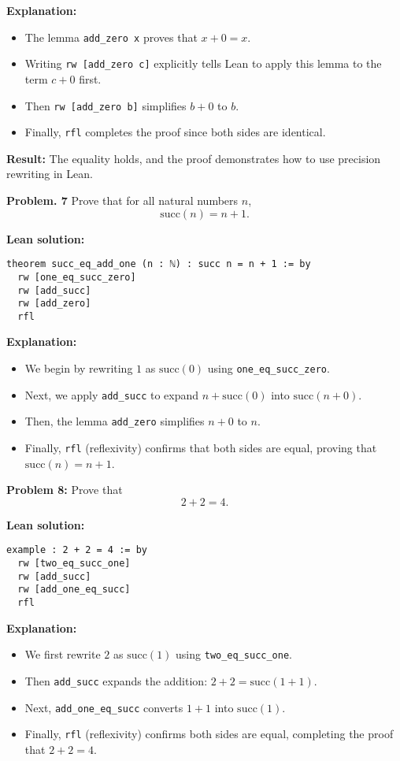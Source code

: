 \documentclass{article}
\theoremstyle{theorem}
\theoremstyle{definition}
\theoremstyle{remark}
\begin{document}
\textbf{Explanation:}
\begin{itemize}
    \item The lemma \texttt{add\_zero x} proves that \(x + 0 = x\).
    \item Writing \texttt{rw [add\_zero c]} explicitly tells Lean to apply this lemma to the term \(c + 0\) first.
    \item Then \texttt{rw [add\_zero b]} simplifies \(b + 0\) to \(b\).
    \item Finally, \texttt{rfl} completes the proof since both sides are identical.
\end{itemize}

\textbf{Result:} The equality holds, and the proof demonstrates how to use precision rewriting in Lean.


\textbf{Problem. 7}  
Prove that for all natural numbers \( n \),
\[
\mathrm{succ}(n) = n + 1.
\]

\medskip
\textbf{Lean solution:}
\begin{verbatim}
theorem succ_eq_add_one (n : ℕ) : succ n = n + 1 := by
  rw [one_eq_succ_zero]
  rw [add_succ]
  rw [add_zero]
  rfl
\end{verbatim}

\textbf{Explanation:}
\begin{itemize}
    \item We begin by rewriting \(1\) as \(\mathrm{succ}(0)\) using \texttt{one\_eq\_succ\_zero}.
    \item Next, we apply \texttt{add\_succ} to expand \(n + \mathrm{succ}(0)\) into \(\mathrm{succ}(n + 0)\).
    \item Then, the lemma \texttt{add\_zero} simplifies \(n + 0\) to \(n\).
    \item Finally, \texttt{rfl} (reflexivity) confirms that both sides are equal, proving that \(\mathrm{succ}(n) = n + 1\).
\end{itemize}

\textbf{Problem 8:}  
Prove that
\[
2 + 2 = 4.
\]

\medskip
\textbf{Lean solution:}
\begin{verbatim}
example : 2 + 2 = 4 := by
  rw [two_eq_succ_one]
  rw [add_succ]
  rw [add_one_eq_succ]
  rfl
\end{verbatim}

\textbf{Explanation:}
\begin{itemize}
    \item We first rewrite \(2\) as \(\mathrm{succ}(1)\) using \texttt{two\_eq\_succ\_one}.
    \item Then \texttt{add\_succ} expands the addition: \(2 + 2 = \mathrm{succ}(1 + 1)\).
    \item Next, \texttt{add\_one\_eq\_succ} converts \(1 + 1\) into \(\mathrm{succ}(1)\).
    \item Finally, \texttt{rfl} (reflexivity) confirms both sides are equal, completing the proof that \(2 + 2 = 4\).
\end{itemize}
\end{document}
